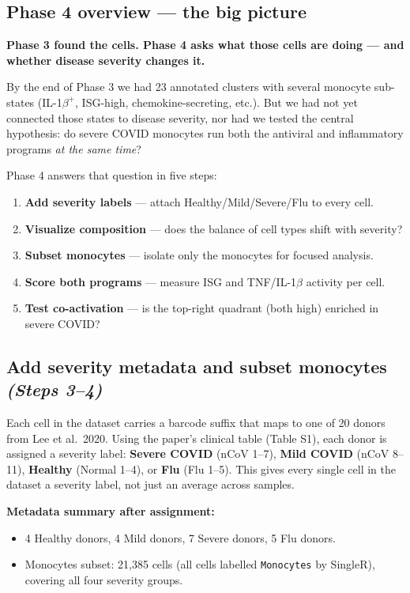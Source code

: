 \documentclass[11pt, a4paper]{article}
\begin{document}
\subsection{Phase 4 overview — the big picture}

\textbf{Phase 3 found the cells. Phase 4 asks what those cells are doing — and whether disease severity changes it.}

By the end of Phase 3 we had 23 annotated clusters with several monocyte sub-states
(IL-1$\beta^+$, ISG-high, chemokine-secreting, etc.). But we had not yet connected
those states to disease severity, nor had we tested the central hypothesis:
do severe COVID monocytes run both the antiviral and inflammatory programs
\textit{at the same time}?

Phase 4 answers that question in five steps:

\begin{enumerate}[nosep]
  \item \textbf{Add severity labels} — attach Healthy/Mild/Severe/Flu to every cell.
  \item \textbf{Visualize composition} — does the balance of cell types shift with severity?
  \item \textbf{Subset monocytes} — isolate only the monocytes for focused analysis.
  \item \textbf{Score both programs} — measure ISG and TNF/IL-1$\beta$ activity per cell.
  \item \textbf{Test co-activation} — is the top-right quadrant (both high) enriched in severe COVID?
\end{enumerate}

\subsection{Add severity metadata and subset monocytes \small\normalfont\textit{(Steps 3–4)}}

Each cell in the dataset carries a barcode suffix that maps to one of 20 donors
from Lee et al.\ 2020. Using the paper's clinical table (Table S1), each donor
is assigned a severity label: \textbf{Severe COVID} (nCoV 1--7),
\textbf{Mild COVID} (nCoV 8--11), \textbf{Healthy} (Normal 1--4), or
\textbf{Flu} (Flu 1--5). This gives every single cell in the dataset a severity
label, not just an average across samples.

\textbf{Metadata summary after assignment:}
\begin{itemize}[nosep]
  \item 4 Healthy donors, 4 Mild donors, 7 Severe donors, 5 Flu donors.
  \item Monocytes subset: 21,385 cells (all cells labelled \texttt{Monocytes}
        by SingleR), covering all four severity groups.
\end{itemize}
\end{document}
